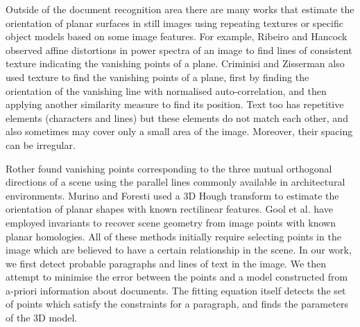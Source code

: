 \documentclass{elsart}   %
\begin{document}
Outside of the document recognition area there are  many works that
estimate the orientation of planar surfaces in still images 
using  repeating textures or specific object models based on some image features.
For example, Ribeiro and Hancock \cite{ribeiro}
observed affine distortions in power spectra of an image to find lines of
consistent texture indicating the vanishing points of a plane. Criminisi and
Zisserman \cite{zisserman} also used texture to find the vanishing points of a
plane,  first by finding the orientation of the vanishing line with normalised
auto-correlation, and then applying another similarity measure to find its position.
Text too has repetitive elements (characters and lines) but
these elements do not match each other, and also sometimes may cover only a
small area of the image. Moreover, their spacing can be irregular.



Rother \cite{rother0} found vanishing points corresponding to the three mutual
orthogonal directions of a scene using the parallel lines commonly available
in architectural environments.  Murino and Foresti \cite{MURIN} used a 3D Hough
transform to estimate the orientation of planar shapes with known rectilinear
features.  Gool et al. \cite{vangool98planar} have employed invariants to
recover scene geometry from image points with known planar homologies.  All of
these methods initially require selecting points in the image which are believed
to have a certain relationship in the scene.  In our work, we first detect
probable paragraphs and lines of text in the image.  We then attempt to minimise
the error between the points and a model constructed from a-priori information
about documents.  The fitting equation itself detects the set of points which
satisfy the constraints for a paragraph, and finds the parameters of the 3D
model.
\end{document}
